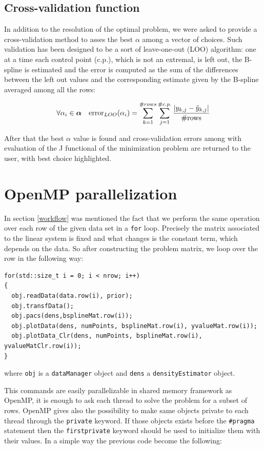 \subsection{Cross-validation function} \label{cv}
In addition to the resolution of the optimal problem, we were asked to provide a cross-validation method to asses the best $\alpha$ among a vector of choices. Such validation has been designed to be a sort of leave-one-out (LOO) algorithm: one at a time each control point (c.p.), which is not an extremal, is left out, the B-spline is estimated and the error is computed as the sum of the differences between the left out values and the corresponding estimate given by the B-spline averaged among all the rows:

\[ \forall \alpha_{i}\in\bm{\alpha}  \quad \text{error}_{LOO}(\alpha_{i}) = \sum_{k=1}^{\#rows}\sum_{j=1}^{\#c.p.} \frac{\\| y_{k,j}-\hat{y}_{k,j} \\| }{\text{\#rows}} \]

After that the best $\alpha$ value is found and cross-validation errors among with evaluation of the J functional of the minimization problem are returned to the user, with best choice highlighted.

\section{OpenMP parallelization} \label{openmp}
In section \ref{workflow} was mentioned the fact that we perform the same operation over each row of the given data set in a \verb|for| loop. Precisely the matrix associated to the linear system is fixed and what changes is the constant term, which depends on the data. So after constructing the problem matrix, we loop over the row in the following way:

\begin{lstlisting}
for(std::size_t i = 0; i < nrow; i++)
{
  obj.readData(data.row(i), prior);
  obj.transfData();
  obj.pacs(dens,bsplineMat.row(i));
  obj.plotData(dens, numPoints, bsplineMat.row(i), yvalueMat.row(i));
  obj.plotData_Clr(dens, numPoints, bsplineMat.row(i), yvalueMatClr.row(i));
}
\end{lstlisting}

where \verb|obj| is a \verb|dataManager| object and \verb|dens| a \verb|densityEstimator| object.

This commands are easily parallelizable in shared memory framework as OpenMP, it is enough to ask each thread to solve the problem for a subset of rows. OpenMP gives also the possibility to make same objects private to each thread through the \verb|private| keyword. If those objects exists before the \verb|#pragma| statement then the \verb|firstprivate| keyword should be used to initialize them with their values. In a simple way the previous code become the following:


